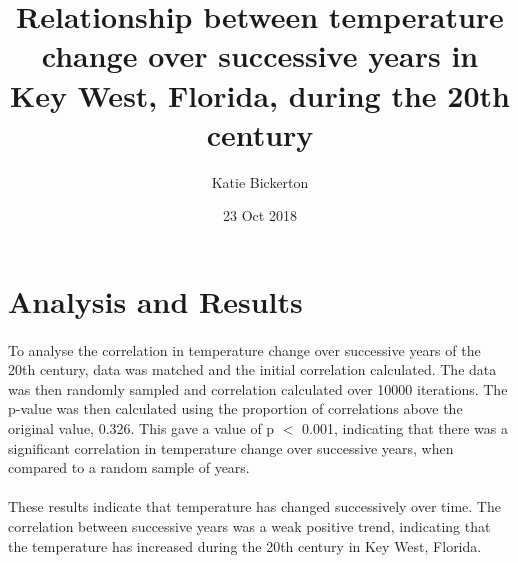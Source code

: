 \documentclass[11pt]{article}
\title{Relationship between temperature change over successive years in Key West, Florida, during the 20th century}
\author{Katie Bickerton}
\date{23 Oct 2018}
\begin{document}
    \maketitle

   	\section{Analysis and Results}
   	\paragraph{}To analyse the correlation in temperature change over successive years of the 20th century, data was matched and the initial correlation calculated. The data was then randomly sampled and correlation calculated over 10000 iterations. The p-value was then calculated using the proportion of correlations above the original value, 0.326. This gave a value of p $<$ 0.001, indicating that there was a significant correlation in temperature change over successive years, when compared to a random sample of years. 
   	
   	\paragraph{}These results indicate that temperature has changed successively over time. The correlation between successive years was a weak positive trend, indicating that the temperature has increased during the 20th century in Key West, Florida.
   	
   	

 
\end{document}
